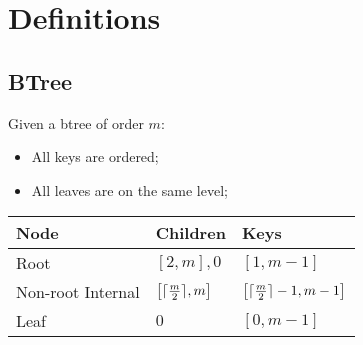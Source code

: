 \section{Definitions}

\subsection{BTree}

  Given a btree of order $ m $:

  \begin{itemize}
    \item All keys are ordered;
    \item All leaves are on the same level;
  \end{itemize}
  
  \begin{tabu} to \columnwidth{ X[1, l] X[1, l] X[2, l] }
    Node & Children & Keys \\ \hline 
    Root & $ \left[ 2, m \right], 0 $ & $ \left[ 1, m - 1 \right] $ \\ \hline 
    Non-root Internal & $ \left[ \lceil \frac{m}{2} \rceil, m \right] $ & $ \left[ \lceil\frac{m}{2}\rceil - 1, m - 1 \right] $ \\ \hline 
    Leaf & $ 0 $ & $ \left[ 0, m - 1 \right] $
  \end{tabu}
